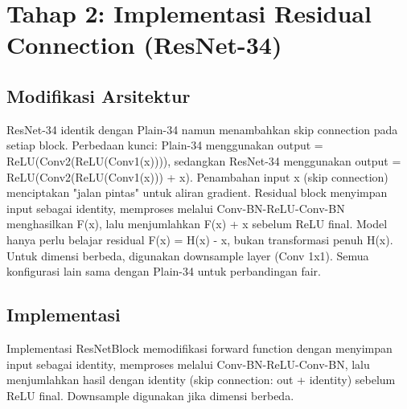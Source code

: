 \documentclass[11pt,a4paper]{article}
\begin{document}
\section{Tahap 2: Implementasi Residual Connection (ResNet-34)}
\subsection{Modifikasi Arsitektur}
ResNet-34 identik dengan Plain-34 namun menambahkan skip connection pada setiap block. Perbedaan kunci: Plain-34 menggunakan output = ReLU(Conv2(ReLU(Conv1(x)))), sedangkan ResNet-34 menggunakan output = ReLU(Conv2(ReLU(Conv1(x))) + x). Penambahan input x (skip connection) menciptakan "jalan pintas" untuk aliran gradient. Residual block menyimpan input sebagai identity, memproses melalui Conv-BN-ReLU-Conv-BN menghasilkan F(x), lalu menjumlahkan F(x) + x sebelum ReLU final. Model hanya perlu belajar residual F(x) = H(x) - x, bukan transformasi penuh H(x). Untuk dimensi berbeda, digunakan downsample layer (Conv 1x1). Semua konfigurasi lain sama dengan Plain-34 untuk perbandingan fair.

\subsection{Implementasi}
Implementasi ResNetBlock memodifikasi forward function dengan menyimpan input sebagai identity, memproses melalui Conv-BN-ReLU-Conv-BN, lalu menjumlahkan hasil dengan identity (skip connection: out + identity) sebelum ReLU final. Downsample digunakan jika dimensi berbeda.
\end{document}
